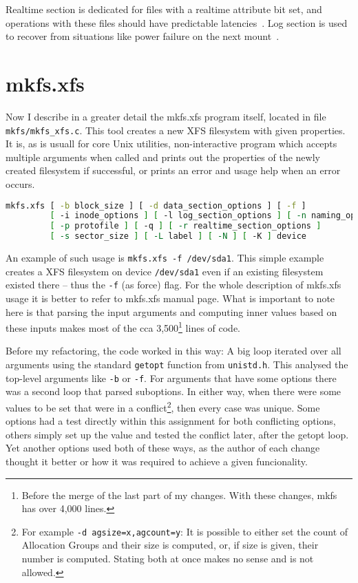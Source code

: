 Realtime section is dedicated for files with a realtime attribute bit set, and operations with these files should have predictable latencies~\cite{xfsRealtime}. Log section is used to recover from situations like power failure on the next mount~\cite{xfsStructure,xfsman}.


\section{mkfs.xfs}\label{chap:xfs:mkfs}
Now I describe in a greater detail the mkfs.xfs program itself, located in file {\tt mkfs/mkfs\_xfs.c}. This tool creates a new XFS filesystem with given properties. It is, as is usuall for core Unix utilities, non-interactive program which accepts multiple arguments when called and prints out the properties of the newly created filesystem if successful, or prints an error and usage help when an error occurs.

\begin{lstlisting}[frame=none, basicstyle=\footnotesize\ttfamily, language=Bash, numbers=none, numberstyle=\tiny\color{black},caption= {Synopsis of mkfs.xfs utility~\cite{mkfs.xfsMan}.}]
mkfs.xfs [ -b block_size ] [ -d data_section_options ] [ -f ]
         [ -i inode_options ] [ -l log_section_options ] [ -n naming_options ]
         [ -p protofile ] [ -q ] [ -r realtime_section_options ]
         [ -s sector_size ] [ -L label ] [ -N ] [ -K ] device
\end{lstlisting}

An example of such usage is {\tt mkfs.xfs -f /dev/sda1}. This simple example creates a XFS filesystem on device {\tt /dev/sda1} even if an existing filesystem existed there -- thus the {\tt -f} (as force) flag. For the whole description of mkfs.xfs usage it is better to refer to mkfs.xfs manual page. What is important to note here is that parsing the input arguments and computing inner values based on these inputs makes most of the cca 3,500\footnote{Before the merge of the last part of my changes. With these changes, mkfs has over 4,000 lines.} lines of code.

Before my refactoring, the code worked in this way: A big loop iterated over all arguments using the standard {\tt getopt} function from {\tt unistd.h}. This analysed the top-level arguments like {\tt -b} or {\tt -f}. For arguments that have some options there was a second loop that parsed suboptions. In either way, when there were some values to be set that were in a conflict\footnote{For example {\tt -d agsize=x,agcount=y}: It is possible to either set the count of Allocation Groups and their size is computed, or, if size is given, their number is computed. Stating both at once makes no sense and is not allowed.}, then every case was unique. Some options had a test directly within this assignment for both conflicting options, others simply set up the value and tested the conflict later, after the getopt loop. Yet another options used both of these ways, as the author of each change thought it better or how it was required to achieve a given funcionality.


